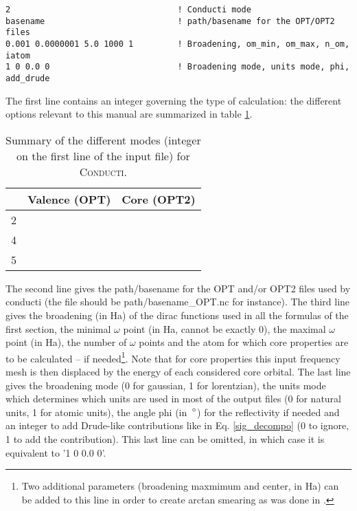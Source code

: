 \documentclass[a4,12pts]{extarticle}
\newcommand{\cmark}{\ding{51}}%
\newcommand{\xmark}{\ding{55}}%
\begin{document}
\begin{verbatim}
2                                  ! Conducti mode
basename                           ! path/basename for the OPT/OPT2 files
0.001 0.0000001 5.0 1000 1         ! Broadening, om_min, om_max, n_om, iatom
1 0 0.0 0                          ! Broadening mode, units mode, phi, add_drude
\end{verbatim}
The first line contains an integer governing the type of calculation: the different options relevant to this manual are summarized in table \ref{table_conducti_mode}.
\begin{table}[h!]
\centering
	\begin{tabular}{l| c c} 
\hline
\hline
 & Valence (OPT) & Core (OPT2) \\
\hline
2 & \cmark & \xmark \\
4 & \cmark & \cmark \\
5 & \xmark & \cmark \\
\hline
\hline
\end{tabular}
\caption{Summary of the different modes (integer on the first line of the input file) for \textsc{Conducti}.} \label{table_conducti_mode}
\end{table}

The second line gives the path/basename for the OPT and/or OPT2 files used by conducti (the file should be path/basename\_OPT.nc for instance). The third line gives the broadening (in Ha) of the dirac functions used in all the formulas of the first section, the minimal $\omega$ point (in Ha, cannot be exactly 0), the maximal $\omega$ point (in Ha), the number of $\omega$ points and the atom for which core properties are to be calculated -- if needed\footnote{Two additional parameters (broadening maxmimum and center, in Ha) can be added to this line in order to create arctan smearing as was done in \cite{Jourdain2020}.}. Note that for core properties this input frequency mesh is then displaced by the energy of each considered core orbital. The last line gives the broadening mode (0 for gaussian, 1 for lorentzian), the units mode which determines which units are used in most of the output files (0 for natural units, 1 for atomic units), the angle phi (in~$\degree$) for the reflectivity if needed and an integer to add Drude-like contributions like in Eq. \ref{sig_decompo} (0 to ignore, 1 to add the contribution).  This last line can be omitted, in which case it is equivalent to '1 0 0.0 0'.


\newpage
\end{document}
